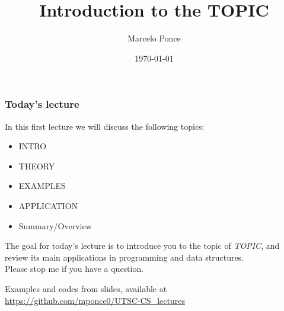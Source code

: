 


\title[TOPIC]{\titlestyle Introduction to the TOPIC}
\author[M.Ponce]{Marcelo Ponce}
\date{\today}




\begin{frame}
  \titlepage
\end{frame}




\begin{frame}
  \frametitle{Today's lecture}

  \vspace{-0.2cm}
  
  \begin{beamerboxesrounded}{In this first lecture we will discuss the following topics:}
  \begin{itemize}
	\item INTRO
	\item THEORY
	\item EXAMPLES
	\item APPLICATION
	\item Summary/Overview
  \end{itemize}
  \end{beamerboxesrounded}

  \vspace{-1mm}
  The goal for today's lecture is to introduce you to the topic of \emph{TOPIC},
  and review its main applications in programming and data structures. 
  \\
  Please stop me if you have a question.

  \vspace{2.5mm}
  \begin{small}
  \begin{beamerboxesrounded}[upper=upcol,lower=lowcol,shadow=true]{Examples and codes from slides, available at}
        \centering
        \url{https://github.com/mponce0/UTSC-CS_lectures}
  \end{beamerboxesrounded}
  \end{small}
\end{frame}




